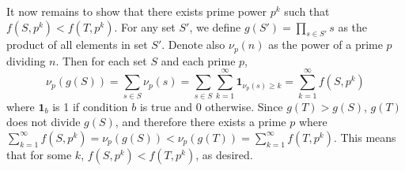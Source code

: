 \documentclass[11pt,a4paper]{article}
\begin{document}
\begin{enumerate}
	It now remains to show that there exists prime power $p^k$ such that 
	$f(S, p^k) < f(T, p^k)$. 
	For any set $S'$, we define $g(S')=\prod_{s\in S'} s$ as the product of all elements in set $S'$. 
	Denote also $\nu_p(n)$ as the power of a prime $p$ dividing $n$. 
	Then for each set $S$ and each prime $p$, 
	\[
	\nu_p(g(S)) = \sum_{s\in S}\nu_p(s) = \sum_{s\in S}\sum_{k = 1}^{\infty} \boldsymbol{1}_{\nu_p(s)\ge k}
	=\sum_{k=1}^{\infty} f(S, p^k)
	\]
	where $\boldsymbol{1}_{b}$ is 1 if condition $b$ is true and 0 otherwise. 
	Since $g(T) > g(S)$, 
	$g(T)$ does not divide $g(S)$, and therefore there exists a prime $p$ where 
	$\sum_{k=1}^{\infty} f(S, p^k)=\nu_p(g(S)) < \nu_p(g(T)) =\sum_{k=1}^{\infty} f(T, p^k)$. 
	This means that for some $k$, $f(S, p^k) < f(T, p^k)$, as desired. 
\end{enumerate}
\end{document}
